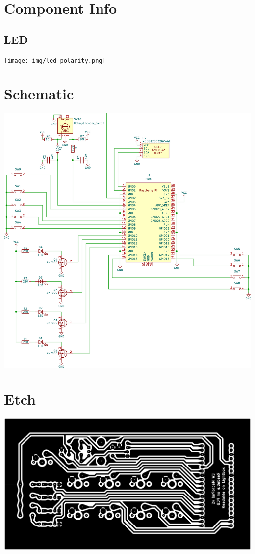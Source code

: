 \section{Component Info}

\begin{minipage}[t]{0.4\textwidth}
\begin{framed}
\subsection*{LED}
\texttt{[image: img/led-polarity.png]}
\end{framed}
\end{minipage}

\explainMosfet

\section{Schematic}
\includegraphics[width=\textwidth]{img/macropad-rev1-schematic.png}

\section{Etch}
\label{sec:etch}
\includegraphics[width=\textwidth]{img/macropad-rev1-B_Cu_Oversized.png}

